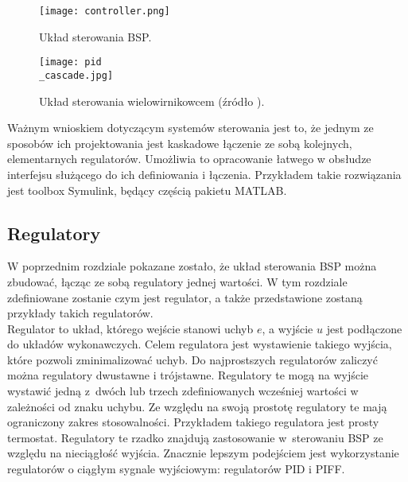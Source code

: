 \begin{figure}[!h]
   	\centering
      	\texttt{[image: controller.png]}
      	\caption{Układ sterowania BSP.}
      	\label{control_3_stage}
\end{figure}

\begin{figure}[!h]
   	\centering
      	\texttt{[image: pid\\\_cascade.jpg]}
      	\caption{Układ sterowania wielowirnikowcem (źródło \cite{energies}).}
      	\label{pid_ladder}
\end{figure}

Ważnym wnioskiem dotyczącym systemów sterowania jest to, że jednym ze sposobów ich projektowania jest kaskadowe łączenie ze sobą kolejnych, elementarnych regulatorów. Umożliwia to opracowanie łatwego w obsłudze interfejsu służącego do ich definiowania i łączenia. Przykładem takie rozwiązania jest toolbox Symulink, będący częścią pakietu MATLAB.

\subsection{Regulatory}

W poprzednim rozdziale pokazane zostało, że układ sterowania BSP można zbudować, łącząc ze sobą regulatory jednej wartości. W tym rozdziale zdefiniowane zostanie czym jest regulator, a także przedstawione zostaną przykłady takich regulatorów.\\

Regulator to układ, którego wejście stanowi uchyb $e$, a wyjście $u$ jest podłączone do układów wykonawczych. Celem regulatora jest wystawienie takiego wyjścia, które pozwoli zminimalizować uchyb. Do najprostszych regulatorów zaliczyć można regulatory dwustawne i trójstawne. Regulatory te mogą na wyjście wystawić jedną z~dwóch lub trzech zdefiniowanych wcześniej wartości w zależności od znaku uchybu. Ze względu na swoją prostotę regulatory te mają ograniczony zakres stosowalności. Przykładem takiego regulatora jest prosty termostat. Regulatory te rzadko znajdują zastosowanie w~sterowaniu BSP ze względu na nieciągłość wyjścia. Znacznie lepszym podejściem jest wykorzystanie regulatorów o ciągłym sygnale wyjściowym: regulatorów PID i PIFF.\\

